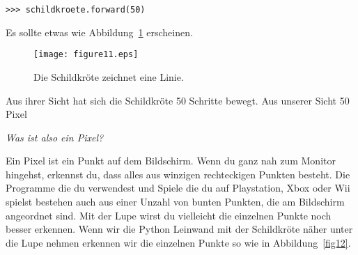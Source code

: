 \begin{listing}
\begin{verbatim}
>>> schildkroete.forward(50)
\end{verbatim}
\end{listing}

Es sollte etwas wie Abbildung~\ref{fig11} erscheinen.

\begin{figure}
\begin{center}
\texttt{[image: figure11.eps]}
\end{center}
\caption{Die Schildkröte zeichnet eine Linie.}\label{fig11}
\end{figure}

Aus ihrer Sicht hat sich die Schildkröte 50 Schritte bewegt. Aus unserer Sicht 50 Pixel

\noindent
\emph{Was ist also ein Pixel?}

Ein Pixel ist ein Punkt auf dem Bildschirm. Wenn du ganz nah zum Monitor hingehst, erkennst du, dass alles aus winzigen rechteckigen Punkten besteht. Die Programme die du verwendest und Spiele die du auf Playstation, Xbox oder Wii spielst bestehen auch aus einer Unzahl von bunten Punkten, die am Bildschirm angeordnet sind. Mit der Lupe wirst du vielleicht die einzelnen Punkte noch besser erkennen. Wenn wir die Python Leinwand mit der Schildkröte näher unter die Lupe nehmen erkennen wir die einzelnen Punkte so wie in Abbildung~\ref{fig12}.

